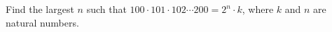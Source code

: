 Find the largest $n$ such that $100\cdot101\cdot102\cdots200=2^{n} \cdot k$, where $k$ and $n$ are natural numbers.

